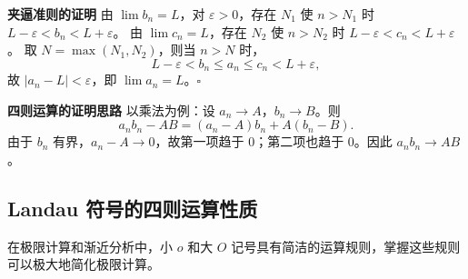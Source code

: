 \documentclass{ctexart}
\newenvironment{custom}[1]{\par\noindent \textbf{#1}\quad}{\par\vspace{1em}}
\begin{document}
\begin{custom}{夹逼准则的证明}
由 \(\lim b_n = L\)，对 \(\varepsilon > 0\)，存在 \(N_1\) 使 \(n > N_1\) 时 \(L - \varepsilon < b_n < L + \varepsilon\)。
由 \(\lim c_n = L\)，存在 \(N_2\) 使 \(n > N_2\) 时 \(L - \varepsilon < c_n < L + \varepsilon\)。
取 \(N = \max(N_1, N_2)\)，则当 \(n > N\) 时，
\[
L - \varepsilon < b_n \leq a_n \leq c_n < L + \varepsilon,
\]
故 \(|a_n - L| < \varepsilon\)，即 \(\lim a_n = L\)。\(\square\)
\end{custom}

\begin{custom}{四则运算的证明思路}
以乘法为例：设 \(a_n \to A\)，\(b_n \to B\)。则
\[
a_n b_n - AB = (a_n - A)b_n + A(b_n - B).
\]
由于 \(b_n\) 有界，\(a_n - A \to 0\)，故第一项趋于 0；第二项也趋于 0。因此 \(a_n b_n \to AB\)。
\end{custom}

\subsection{Landau 符号的四则运算性质}

在极限计算和渐近分析中，小 \(o\) 和大 \(O\) 记号具有简洁的运算规则，掌握这些规则可以极大地简化极限计算。
\end{document}
